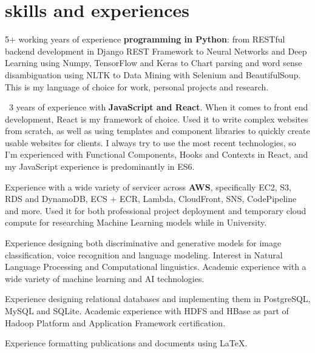 \documentclass[]{cv-roald}
\begin{document}
\section*{skills and experiences}
\begin{tabitemize}
    \item 5+ working years of experience \textbf{programming in Python}: from RESTful backend development in Django REST Framework to Neural Networks and Deep Learning using Numpy, TensorFlow and Keras to Chart parsing and word sense disambiguation using NLTK to Data Mining with Selenium and BeautifulSoup. This is my language of choice for work, personal projects and research.
    \item ~3 years of experience with \textbf{JavaScript and React}. When it comes to front end development, React is my framework of choice. Used it to write complex websites from scratch, as well as using templates and component libraries to quickly create usable websites for clients. I always try to use the most recent technologies, so I'm experienced with Functional Components, Hooks and Contexts in React, and my JavaScript experience is predominantly in ES6.
    \item Experience with a wide variety of servicer across \textbf{AWS}, specifically EC2, S3, RDS and DynamoDB, ECS + ECR, Lambda, CloudFront, SNS, CodePipeline and more. Used it for both professional project deployment and temporary cloud compute for researching Machine Learning models while in University.
    \item Experience designing both discriminative and generative models for image classification, voice recognition and language modeling. Interest in Natural Language Processing and Computational linguistics. Academic experience with a wide variety of machine learning and AI technologies.
    \item Experience designing relational databases and implementing them in PostgreSQL, MySQL and SQLite. Academic experience with HDFS and HBase as part of Hadoop Platform and Application Framework certification.
    \item Experience formatting publications and documents using \LaTeX. 

\end{tabitemize}

                    
    
\end{document}
